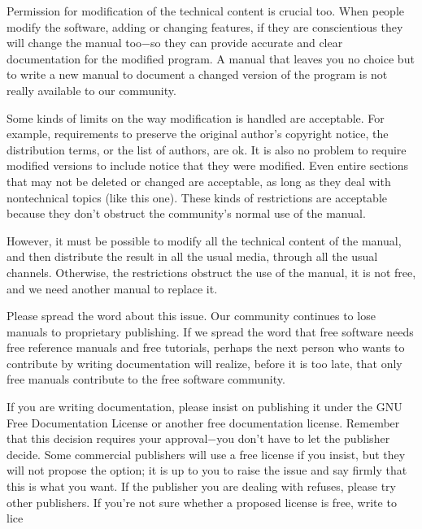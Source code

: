 Permission for modification of the technical content is crucial too. When people modify the software, adding or changing features, if they are conscientious they will
change the manual too$-$so they can provide accurate and clear documentation for the modified program. A manual that leaves you no choice but to write a new manual to
document a changed version of the program is not really available to our community.

Some kinds of limits on the way modification is handled are acceptable. For example, requirements to preserve the original author's copyright notice, the distribution
terms, or the list of authors, are ok. It is also no problem to require modified versions to include notice that they were modified. Even entire sections that may not
be deleted or changed are acceptable, as long as they deal with nontechnical topics (like this one). These kinds of restrictions are acceptable because they don't
obstruct the community's normal use of the manual.

However, it must be possible to modify all the technical content of the manual, and then distribute the result in all the usual media, through all the usual channels.
Otherwise, the restrictions obstruct the use of the manual, it is not free, and we need another manual to replace it.

Please spread the word about this issue. Our community continues to lose manuals to proprietary publishing. If we spread the word that free software needs free reference
manuals and free tutorials, perhaps the next person who wants to contribute by writing documentation will realize, before it is too late, that only free manuals contribute
to the free software community.

If you are writing documentation, please insist on publishing it under the GNU Free Documentation License or another free documentation license. Remember that this decision
requires your approval$-$you don't have to let the publisher decide. Some commercial publishers will use a free license if you insist, but they will not propose the option;
it is up to you to raise the issue and say firmly that this is what you want. If the publisher you are dealing with refuses, please try other publishers. If you're not sure
whether a proposed license is free, write to lice


